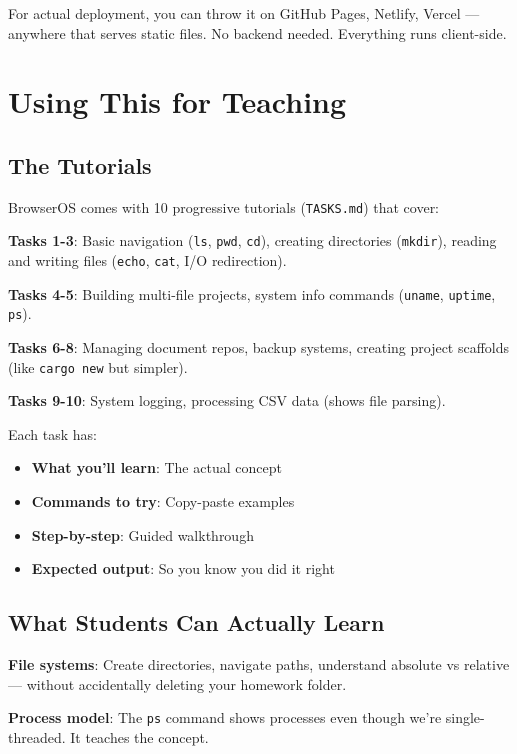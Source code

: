 \documentclass[conference]{IEEEtran}
\begin{document}
For actual deployment, you can throw it on GitHub Pages, Netlify, Vercel — anywhere that serves static files. No backend needed. Everything runs client-side.

\section{Using This for Teaching}

\subsection{The Tutorials}

BrowserOS comes with 10 progressive tutorials (\texttt{TASKS.md}) that cover:

\textbf{Tasks 1-3}: Basic navigation (\texttt{ls}, \texttt{pwd}, \texttt{cd}), creating directories (\texttt{mkdir}), reading and writing files (\texttt{echo}, \texttt{cat}, I/O redirection).

\textbf{Tasks 4-5}: Building multi-file projects, system info commands (\texttt{uname}, \texttt{uptime}, \texttt{ps}).

\textbf{Tasks 6-8}: Managing document repos, backup systems, creating project scaffolds (like \texttt{cargo new} but simpler).

\textbf{Tasks 9-10}: System logging, processing CSV data (shows file parsing).

Each task has:
\begin{itemize}
    \item \textbf{What you'll learn}: The actual concept
    \item \textbf{Commands to try}: Copy-paste examples
    \item \textbf{Step-by-step}: Guided walkthrough
    \item \textbf{Expected output}: So you know you did it right
\end{itemize}

\subsection{What Students Can Actually Learn}

\textbf{File systems}: Create directories, navigate paths, understand absolute vs relative — without accidentally deleting your homework folder.

\textbf{Process model}: The \texttt{ps} command shows processes even though we're single-threaded. It teaches the concept.
\end{document}
